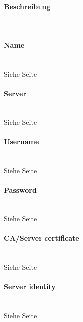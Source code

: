 \begin{minipage}[t]{0.5\textwidth}
\vspace{0pt}
\paragraph{Beschreibung}\mbox{}\\
\paragraph{Name}\mbox{}\\
Siehe Seite \pageref{name} \\

\paragraph{Server}\mbox{}\\
Siehe Seite \pageref{server} \\

\paragraph{Username}\mbox{}\\
Siehe Seite \pageref{username} \\

\paragraph{Password}\mbox{}\\
Siehe Seite \pageref{password} \\

\paragraph{CA/Server certificate}\mbox{}\\
Siehe Seite \pageref{servercertificate} \\

\paragraph{Server identity}\mbox{}\\
Siehe Seite \pageref{serveridentitiy} \\

\end{minipage}
\newpage

